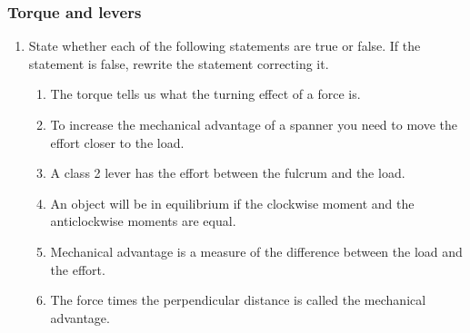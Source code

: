 \subsubsection{Torque and levers}
\begin{enumerate}

\item {State whether each of the following statements are true or false. If the statement is false, rewrite the statement correcting it. 
	\begin{enumerate}
	\item The torque tells us what the turning effect of a force is.
	\item To increase the mechanical advantage of a spanner you need to move the effort closer to the load.
	\item A class 2 lever has the effort between the fulcrum and the load.
	\item An object will be in equilibrium if the clockwise moment and the anticlockwise moments are equal.
	\item Mechanical advantage is a measure of the difference between the load and the effort.
	\item The force times the perpendicular distance is called the mechanical advantage.
	\end{enumerate}}


\end{enumerate}
